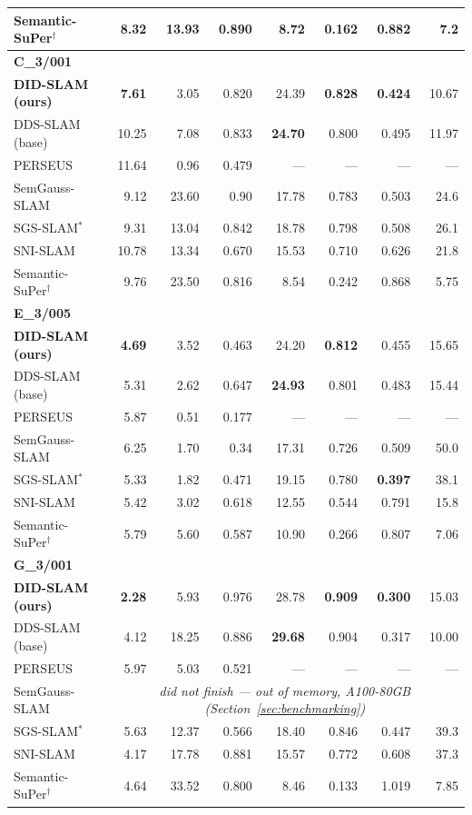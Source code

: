 \documentclass{article}
\begin{document}
\begin{table}[!ht]
{\begin{tabular}{l rrr rrrr}
Semantic-SuPer$^{\dagger}$~\cite{Lin2023} & 8.32 & 13.93 & 0.890 & 8.72 & 0.162 & 0.882 & 7.2 \\
\midrule
\multicolumn{8}{l}{\textbf{C\_3/001}} \\
\midrule
\textbf{DID-SLAM (ours)} & \textbf{7.61} & 3.05 & 0.820 & 24.39 & \textbf{0.828} & \textbf{0.424} & 10.67 \\
DDS-SLAM (base)~\cite{Shan2024} & 10.25 & 7.08 & 0.833 & \textbf{24.70} & 0.800 & 0.495 & 11.97 \\
PERSEUS & 11.64 & 0.96 & 0.479 & --- & --- & --- & --- \\
SemGauss-SLAM~\cite{Zhu2025} & 9.12 & 23.60 & 0.90 & 17.78 & 0.783 & 0.503 & 24.6 \\
SGS-SLAM$^{*}$~\cite{sgsslam} & 9.31 & 13.04 & 0.842 & 18.78 & 0.798 & 0.508 & 26.1 \\
SNI-SLAM~\cite{Zhu2024} & 10.78 & 13.34 & 0.670 & 15.53 & 0.710 & 0.626 & 21.8 \\
Semantic-SuPer$^{\dagger}$~\cite{Lin2023} & 9.76 & 23.50 & 0.816 & 8.54 & 0.242 & 0.868 & 5.75 \\
\midrule
\multicolumn{8}{l}{\textbf{E\_3/005}} \\
\midrule
\textbf{DID-SLAM (ours)} & \textbf{4.69} & 3.52 & 0.463 & 24.20 & \textbf{0.812} & 0.455 & 15.65 \\
DDS-SLAM (base)~\cite{Shan2024} & 5.31 & 2.62 & 0.647 & \textbf{24.93} & 0.801 & 0.483 & 15.44 \\
PERSEUS & 5.87 & 0.51 & 0.177 & --- & --- & --- & --- \\
SemGauss-SLAM~\cite{Zhu2025} & 6.25 & 1.70 & 0.34 & 17.31 & 0.726 & 0.509 & 50.0 \\
SGS-SLAM$^{*}$~\cite{sgsslam} & 5.33 & 1.82 & 0.471 & 19.15 & 0.780 & \textbf{0.397} & 38.1 \\
SNI-SLAM~\cite{Zhu2024} & 5.42 & 3.02 & 0.618 & 12.55 & 0.544 & 0.791 & 15.8 \\
Semantic-SuPer$^{\dagger}$~\cite{Lin2023} & 5.79 & 5.60 & 0.587 & 10.90 & 0.266 & 0.807 & 7.06 \\
\midrule
\multicolumn{8}{l}{\textbf{G\_3/001}} \\
\midrule
\textbf{DID-SLAM (ours)} & \textbf{2.28} & 5.93 & 0.976 & 28.78 & \textbf{0.909} & \textbf{0.300} & 15.03 \\
DDS-SLAM (base)~\cite{Shan2024} & 4.12 & 18.25 & 0.886 & \textbf{29.68} & 0.904 & 0.317 & 10.00 \\
PERSEUS & 5.97 & 5.03 & 0.521 & --- & --- & --- & --- \\
SemGauss-SLAM~\cite{Zhu2025} & \multicolumn{7}{c}{\emph{did not finish --- out of memory, A100-80GB (Section~\ref{sec:benchmarking})}} \\
SGS-SLAM$^{*}$~\cite{sgsslam} & 5.63 & 12.37 & 0.566 & 18.40 & 0.846 & 0.447 & 39.3 \\
SNI-SLAM~\cite{Zhu2024} & 4.17 & 17.78 & 0.881 & 15.57 & 0.772 & 0.608 & 37.3 \\
Semantic-SuPer$^{\dagger}$~\cite{Lin2023} & 4.64 & 33.52 & 0.800 & 8.46 & 0.133 & 1.019 & 7.85 \\
\bottomrule
\end{tabular}}
\end{table}
\FloatBarrier
\end{document}

